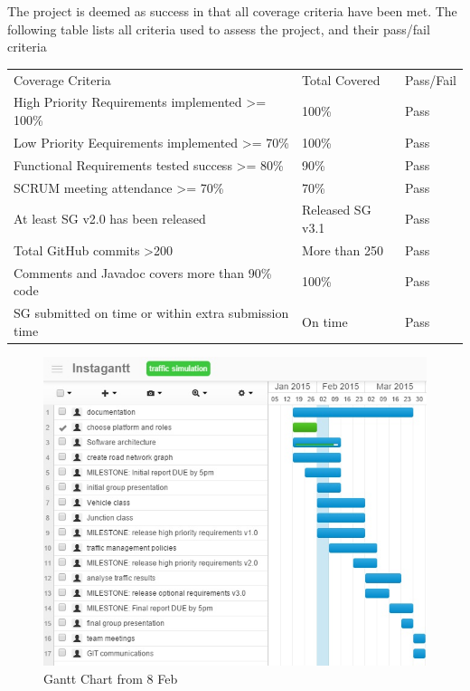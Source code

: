 \documentclass[11pt]{article}
\begin{document}
\begin{enumerate}
The project is deemed as success in that all coverage criteria have been met.
The following table lists all criteria used to assess the project, and their pass/fail criteria

\begin{table}[h]
\begin{tabular}{lll}
Coverage Criteria & Total Covered & Pass/Fail \\
High Priority Requirements implemented \textgreater= 100\% & 100\% & Pass \\
Low Priority Eequirements implemented \textgreater= 70\% & 100\% & Pass \\
Functional Requirements tested success \textgreater= 80\% & 90\% & Pass \\
SCRUM meeting attendance \textgreater= 70\% & 70\% & Pass \\
At least SG v2.0 has been released & Released SG v3.1 & Pass \\
Total GitHub commits \textgreater 200 & More than 250 & Pass \\
Comments and Javadoc covers more than 90\% code & 100\% & Pass \\
SG submitted on time or within extra submission time & On time & Pass
\end{tabular}
\end{table}


\begin{figure}
\begin{center}
\includegraphics[scale=0.65]{gantt8Feb}
\caption{Gantt Chart from 8 Feb}
\end{center}
\end{figure}


\end{enumerate}
\end{document}
